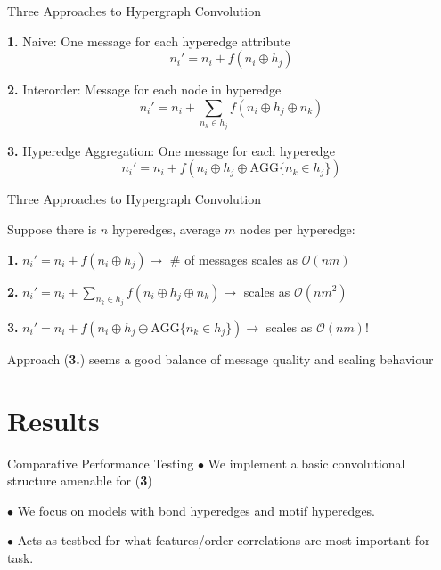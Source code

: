 \documentclass[11pt]{beamer}
\begin{document}
\begin{frame}{Three Approaches to Hypergraph Convolution}

\textbf{1.} Naive: One message for each hyperedge attribute
$$
n_i' =  n_i + f(n_i \oplus h_j ) 
$$
\pause

\textbf{2.} Interorder:  Message for each node in hyperedge
$$
n_i' =  n_i + \sum_{n_k \in h_j}f(n_i \oplus h_j\oplus n_k ) 
$$
\pause

\textbf{3.} Hyperedge Aggregation: One message for each hyperedge 
$$
n_i' =  n_i + f(n_i \oplus h_j\oplus \text{AGG}\lbrace n_k\in h_j \rbrace ) 
$$

\end{frame}

\begin{frame}{Three Approaches to Hypergraph Convolution}

Suppose there is $n$ hyperedges, average $m$ nodes per hyperedge:\pause

\vspace{1cm}

\textbf{1.}
$
n_i' =  n_i + f(n_i \oplus h_j ) 
\rightarrow$
\# of messages scales as $\mathcal{O}(nm)$
\medskip\pause

\textbf{2.}  $
n_i' =  n_i + \sum_{n_k \in h_j}f(n_i \oplus h_j\oplus n_k ) 
\rightarrow $
scales as $\mathcal{O}(nm^2)$

\medskip\pause

\textbf{3.} $
n_i' =  n_i + f(n_i \oplus h_j\oplus \text{AGG}\lbrace n_k\in h_j \rbrace ) \rightarrow
$ scales as $\mathcal{O}(nm)$!

\vspace{0.7cm}\pause

Approach (\textbf{3.}) seems a good balance of message quality and scaling behaviour
\end{frame}

\section{Results}
\begin{frame}{Comparative Performance Testing}
$\bullet$ We implement a basic convolutional structure amenable for (\textbf{3})
\vspace{1cm}\pause

$\bullet$ We focus on models with bond hyperedges and motif hyperedges.

\vspace{1cm}\pause

$\bullet$ Acts as testbed for what features/order correlations are most important for task.

\end{frame}
\end{document}
